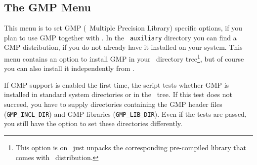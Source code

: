 
\subsection{The GMP Menu}\label{sec:gmp-menu}

This menu is to set GMP (\gnu\ Multiple Precision Library) specific
options, if you plan to use GMP together with \cgal . In the {\tt
  auxiliary} directory you can find a GMP distribution, if you do not
already have it installed on your system. This menu contains an option
to install GMP in your \cgal\ directory tree\footnote{This option is
  on \msvc\ just unpacks the corresponding pre-compiled library that
  comes with \cgal\ distribution.}, but of course you can also install
it independently from \cgal .

If GMP support is enabled the first time, the script tests whether GMP
is installed in standard system directories or in the \cgal\ tree. If
this test does not succeed, you have to supply directories containing
the GMP header files (\texttt{GMP\_INCL\_DIR})\TTindex{GMP\_INCL\_DIR}
and GMP libraries ({\tt GMP\_LIB\_DIR})\TTindex{GMP\_LIB\_DIR}.  Even
if the tests are passed, you still have the option to set these
directories differently.\bigskip

